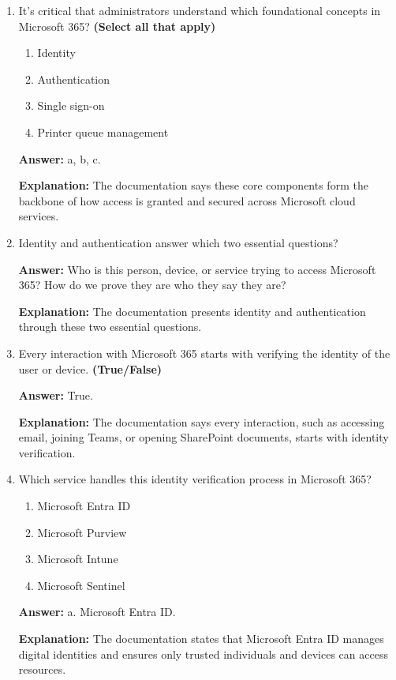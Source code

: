 \documentclass[10pt]{article}
\begin{document}
\begin{enumerate}[leftmargin=*]

\item It’s critical that administrators understand which foundational concepts in Microsoft 365? \textbf{(Select all that apply)}
\begin{enumerate}[label=\alph*., leftmargin=1.5em]
\item Identity
\item Authentication
\item Single sign-on
\item Printer queue management
\end{enumerate}
\textbf{Answer:} a, b, c.

\textbf{Explanation:} The documentation says these core components form the backbone of how access is granted and secured across Microsoft cloud services.

\item Identity and authentication answer which two essential questions?

\textbf{Answer:} Who is this person, device, or service trying to access Microsoft 365? How do we prove they are who they say they are?

\textbf{Explanation:} The documentation presents identity and authentication through these two essential questions.

\item Every interaction with Microsoft 365 starts with verifying the identity of the user or device. \textbf{(True/False)}

\textbf{Answer:} True.

\textbf{Explanation:} The documentation says every interaction, such as accessing email, joining Teams, or opening SharePoint documents, starts with identity verification.

\item Which service handles this identity verification process in Microsoft 365?
\begin{enumerate}[label=\alph*., leftmargin=1.5em]
\item Microsoft Entra ID
\item Microsoft Purview
\item Microsoft Intune
\item Microsoft Sentinel
\end{enumerate}
\textbf{Answer:} a. Microsoft Entra ID.

\textbf{Explanation:} The documentation states that Microsoft Entra ID manages digital identities and ensures only trusted individuals and devices can access resources.


\end{enumerate}
\end{document}
